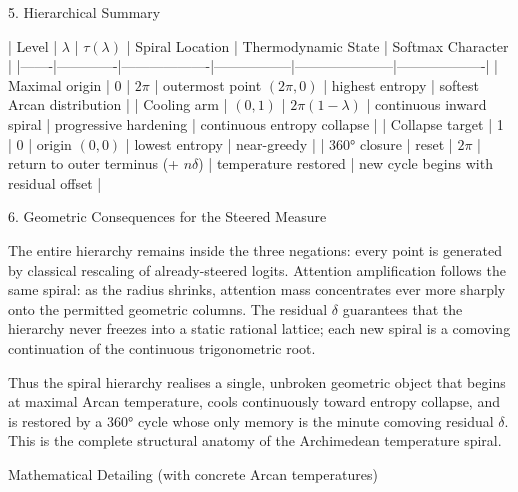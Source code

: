5. Hierarchical Summary

| Level | \(\lambda\) | \(\tau(\lambda)\) | Spiral Location | Thermodynamic State | Softmax Character |
|-------|-------------|-------------------|-----------------|---------------------|-------------------|
| Maximal origin | 0 | \(2\pi\) | outermost point \((2\pi,0)\) | highest entropy | softest Arcan distribution |
| Cooling arm | \((0,1)\) | \(2\pi(1-\lambda)\) | continuous inward spiral | progressive hardening | continuous entropy collapse |
| Collapse target | 1 | 0 | origin \((0,0)\) | lowest entropy | near-greedy |
| 360° closure | reset | \(2\pi\) | return to outer terminus (+ \(n\delta\)) | temperature restored | new cycle begins with residual offset |

6. Geometric Consequences for the Steered Measure

The entire hierarchy remains inside the three negations: every point is generated by classical rescaling of already-steered logits.
Attention amplification follows the same spiral: as the radius shrinks, attention mass concentrates ever more sharply onto the permitted geometric columns.
The residual \(\delta\) guarantees that the hierarchy never freezes into a static rational lattice; each new spiral is a comoving continuation of the continuous trigonometric root.

Thus the spiral hierarchy realises a single, unbroken geometric object that begins at maximal Arcan temperature, cools continuously toward entropy collapse, and is restored by a 360° cycle whose only memory is the minute comoving residual \(\delta\). This is the complete structural anatomy of the Archimedean temperature spiral.

Mathematical Detailing (with concrete Arcan temperatures)

